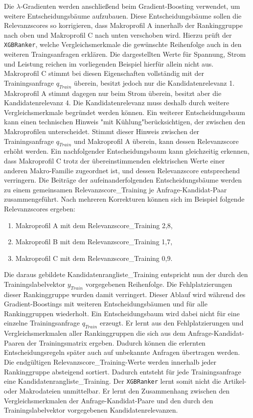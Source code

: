 Die $\lambda$-Gradienten werden anschließend beim Gradient-Boosting verwendet, um weitere Entscheidungsbäume aufzubauen. 
Diese Entscheidungsbäume sollen die Relevanzscores so korrigieren, dass Makroprofil A innerhalb der Rankinggruppe nach oben und Makroprofil C nach unten verschoben wird. 
Hierzu prüft der \texttt{XGBRanker}, welche Vergleichsmerkmale die gewünschte Reihenfolge auch in den weiteren Traingsanfragen erklären. 
Die dargestellten Werte für Spannung, Strom und Leistung reichen im vorliegenden Beispiel hierfür allein nicht aus. 
Makroprofil C stimmt bei diesen Eigenschaften vollständig mit der Trainingsanfrage \(q_{Train}\) überein, besitzt jedoch nur die Kandidatenrelevanz 1. Makroprofil A stimmt dagegen nur beim Strom überein, besitzt aber die Kandidatenrelevanz 4. 
Die Kandidatenrelevanz muss deshalb durch weitere Vergleichsmerkmale begründet werden können. Ein weiterer Entscheidungsbaum kann einen technischen Hinweis "mit Kühlung"berücksichtigen, der zwischen den Makroprofilen unterscheidet. 
Stimmt dieser Hinweis zwischen der Trainingsanfrage \(q_{Train}\) und Makroprofil A überein, kann dessen Relevanzscore erhöht werden. Ein nachfolgender Entscheidungsbaum kann gleichzeitig erkennen, 
dass Makroprofil C trotz der übereinstimmenden elektrischen Werte einer anderen Makro-Familie zugeordnet ist, und dessen Relevanzscore entsprechend verringern. 
Die Beiträge der aufeinanderfolgenden Entscheidungsbäume werden zu einem gemeinsamen Relevanzscore\_Training je Anfrage-Kandidat-Paar zusammengeführt.
Nach mehreren Korrekturen können sich im Beispiel folgende Relevanzscores ergeben: 
\begin{enumerate} 
    \item Makroprofil A mit dem Relevanzscore\_Training 2,8, 
    \item Makroprofil B mit dem Relevanzscore\_Training 1,7, 
    \item Makroprofil C mit dem Relevanzscore\_Training 0,9. 
\end{enumerate} 

Die daraus gebildete Kandidatenrangliste\_Training entspricht nun der durch den Trainingslabelvektor \(y_{Train}\) vorgegebenen Reihenfolge. 
Die Fehlplatzierungen dieser Rankinggruppe wurden damit verringert. 
Dieser Ablauf wird während des Gradient-Boostings mit weiteren Entscheidungsbäumen und für alle Rankinggruppen wiederholt. 
Ein Entscheidungsbaum wird dabei nicht für eine einzelne Trainingsanfrage \(q_{Train}\) erzeugt. Er lernt aus den Fehlplatzierungen und Vergleichsmerkmalen aller Rankinggruppen die sich aus dem Anfrage-Kandidat-Paaren der Trainingsmatrix ergeben. 
Dadurch können die erlernten Entscheidungsregeln später auch auf unbekannte Anfragen übertragen werden. Die endgültigen Relevanzscore\_Training-Werte werden innerhalb jeder Rankinggruppe absteigend sortiert. 
Dadurch entsteht für jede Trainingsanfrage eine Kandidatenrangliste\_Training. 
Der \texttt{XGBRanker} lernt somit nicht die Artikel- oder Makrodateien unmittelbar. Er lernt den Zusammenhang zwischen den Vergleichsmerkmalen der Anfrage-Kandidat-Paare und den durch den Trainingslabelvektor vorgegebenen Kandidatenrelevanzen. 



